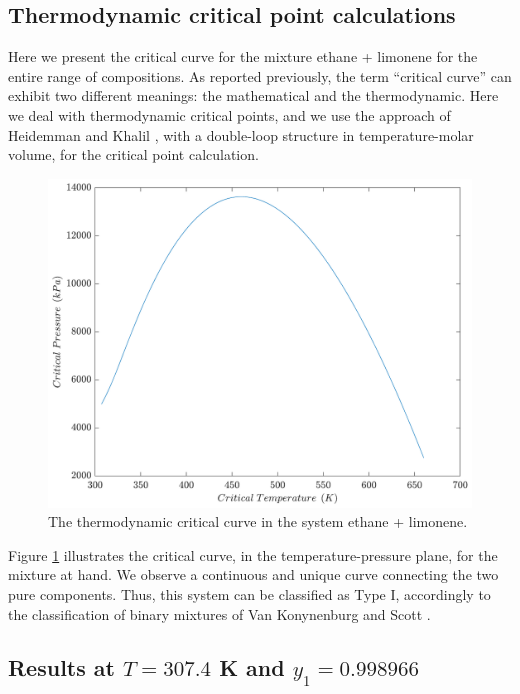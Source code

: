\documentclass[journal=iecred,manuscript=article]{achemso}
\theoremstyle{definition}
\theoremstyle{remark}
\begin{document}
\subsection{Thermodynamic critical point calculations}

Here we present the critical curve for the mixture ethane + limonene for the entire range of compositions. As reported previously, the term \enquote{critical curve} can exhibit two different meanings: the mathematical  and the thermodynamic.
 Here we deal
 with thermodynamic critical points, and we use the approach of Heidemman and Khalil \citep{heidemman}, with a double-loop structure in temperature-molar volume, for the critical point calculation.
 
\begin{figure}
	\begin{center}
		\includegraphics[scale=0.50]{temperatura_pressao.pdf}
		\caption{The thermodynamic critical curve in the system ethane + limonene.}\label{fig:critical_thermo}
	\end{center}
\end{figure}

Figure \ref{fig:critical_thermo} illustrates the critical curve, in the temperature-pressure plane, for the mixture at hand. We observe a continuous and unique curve connecting the two pure components. Thus, this system can be classified as Type I, accordingly to the classification of binary mixtures of Van Konynenburg and Scott \cite{classif}.

\subsection{Results at $T = 307.4 $ K and $y_1 = 0.998966$}
\end{document}
